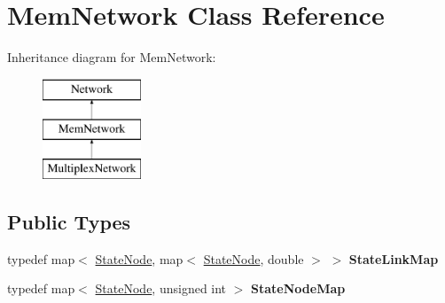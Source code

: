 \hypertarget{classMemNetwork}{}\section{Mem\+Network Class Reference}
\label{classMemNetwork}
Inheritance diagram for Mem\+Network\+:\begin{figure}[H]
\begin{center}
\leavevmode
\includegraphics[height=3.000000cm]{classMemNetwork}
\end{center}
\end{figure}
\subsection*{Public Types}
\begin{DoxyCompactItemize}
\item 
\mbox{\label{classMemNetwork_a64ae997611534ee80c4993a49ccbb652}} 
typedef map$<$ \mbox{\hyperlink{structStateNode}{State\+Node}}, map$<$ \mbox{\hyperlink{structStateNode}{State\+Node}}, double $>$ $>$ {\bfseries State\+Link\+Map}
\item 
\mbox{\label{classMemNetwork_a8eba1b8ed53d6d20635f1772f5b9528f}} 
typedef map$<$ \mbox{\hyperlink{structStateNode}{State\+Node}}, unsigned int $>$ {\bfseries State\+Node\+Map}
\end{DoxyCompactItemize}
